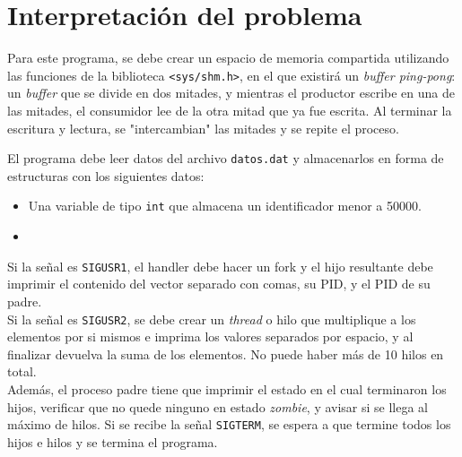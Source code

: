\section{Interpretación del problema}
Para este programa, se debe crear un espacio de memoria compartida utilizando las funciones de la biblioteca \texttt{<sys/shm.h>}, en el que existirá un \textit{buffer ping-pong}: un \textit{buffer} que se divide en dos mitades, y mientras el productor escribe en una de las mitades, el consumidor lee de la otra mitad que ya fue escrita. Al terminar la escritura y lectura, se "intercambian" las mitades y se repite el proceso.

El programa debe leer datos del archivo \texttt{datos.dat} y almacenarlos en forma de estructuras con los siguientes datos:\\

\begin{itemize}
    \item Una variable de tipo \texttt{int} que almacena un identificador menor a 50000.
    \item 
\end{itemize}

Si la señal es \texttt{SIGUSR1}, el handler debe hacer un fork y el hijo resultante debe imprimir el contenido del vector separado con comas, su PID, y el PID de su padre.\\

Si la señal es \texttt{SIGUSR2}, se debe crear un \textit{thread} o hilo que multiplique a los elementos por si mismos e imprima los valores separados por espacio, y al finalizar devuelva la suma de los elementos. No puede haber más de 10 hilos en total.\\

Además, el proceso padre tiene que imprimir el estado en el cual terminaron los hijos, verificar que no quede ninguno en estado \textit{zombie}, y avisar si se llega al máximo de hilos. Si se recibe la señal \texttt{SIGTERM}, se espera a que termine todos los hijos e hilos y se termina el programa.
